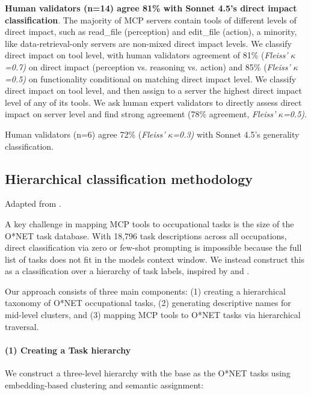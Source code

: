 \documentclass[manuscript,screen,nonacm,oneside]{acmart}
\begin{document}
\textbf{Human validators (n=14) agree 81\% with Sonnet 4.5's direct impact classification}. The majority of MCP servers contain tools of different levels of direct impact, such as read\_file (perception) and edit\_file (action), a minority, like data-retrieval-only servers are non-mixed direct impact levels. We classify direct impact on tool level, with human validators agreement of 81\% (\emph{Fleiss'} \(\kappa\)\emph{=0.7)} on direct impact (perception vs. reasoning vs. action) and 85\% (\emph{Fleiss'} \(\kappa\)\emph{=0.5)} on functionality conditional on matching direct impact level. We classify direct impact on tool level, and then assign to a server the highest direct impact level of any of its tools. We ask human expert validators to directly assess direct impact on server level and find strong agreement (78\% agreement, \emph{Fleiss'} \(\kappa\)\emph{=0.5)}.

Human validators (n=6) agree 72\% (\emph{Fleiss'} \(\kappa\)\emph{=0.3)} with Sonnet 4.5's generality classification.

\subsection{Hierarchical classification methodology}
\label{app:hierarchy}

Adapted from \citet[supplementary materials]{handa2025which}.

A key challenge in mapping MCP tools to occupational tasks is the size of the O*NET task database. With 18,796 task descriptions across all occupations, direct classification via zero or few-shot prompting is impossible because the full list of tasks does not fit in the model\textquotesingle s context window. We instead construct this as a classification over a hierarchy of task labels, inspired by \citet{morin2005hierarchical} and \citet{mnih2008scalable}.

Our approach consists of three main components: (1) creating a hierarchical taxonomy of O*NET occupational tasks, (2) generating descriptive names for mid-level clusters, and (3) mapping MCP tools to O*NET tasks via hierarchical traversal.

\paragraph{(1) Creating a Task hierarchy}\label{creating-a-task-hierarchy}

We construct a three-level hierarchy with the base as the O*NET tasks using embedding-based clustering and semantic assignment:
\end{document}
